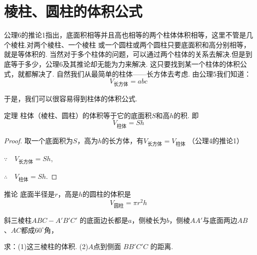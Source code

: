 \section{棱柱、圆柱的体积公式}



公理6的推论1指出，底面积相等并且高也相等的两个柱体体积相等，这里不管是几个棱柱.对两个棱柱、一个棱柱
或一个圆柱或两个圆柱只要底面积和高分别相等，就是等体积的. 当然对于多个柱体的问题，可以通过两个柱体的关系去解决.但是到底等于多少，公理6及其推论却无能为力来解决. 这只要找到某一个柱体的体积公式，就都解决了. 自然我们从最简单的柱体——长方体去考虑. 由公理5我们知道：
\[V_{\text{长方体}}=abc\]

于是，我们可以很容易得到柱体的体积公式.

\begin{thm}{定理}
     柱体（棱柱、圆柱）的体积等于它的底面积$S$和高$h$的积.
即
\[
V_{\text{柱体}}=Sh\]
\end{thm}

\begin{proof}
    取一个底面积为$S$，高为$h$的长方体，有$
V_{\text{长方体}}=V_{\text{柱体}}$
（公理4的推论1）

$\because\quad V_{\text{长方体}}=Sh$,

$\therefore\quad V_{\text{柱体}}=Sh$.
\end{proof}


\begin{thm}
{推论} 底面半径是$r$，高是$h$的圆柱的体积是
\[V_{\text{圆柱}}=\pi r^{2}h\]    
\end{thm}

\begin{example}
    斜三棱柱$ABC-A'B'C'$ 的底面边长都是$a$，侧棱长为$b$，侧棱$AA'$与底面两边$AB$、$AC$都成$60^{\circ}$角，
    
    求：(1)这三棱柱的体积. (2)$A$点到侧面 $BB'C'C$ 的距离.
\end{example}

